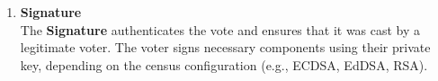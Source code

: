 \begin{enumerate}
	\begin{figure}[H]
		\centering
	\end{figure}
		
	
	\item \textbf{Signature}\\
	
			The \textbf{Signature} authenticates the vote and ensures that it was cast by a legitimate voter. The voter signs necessary components using their private key, depending on the census configuration (e.g., ECDSA, EdDSA, RSA).	
\end{enumerate}
